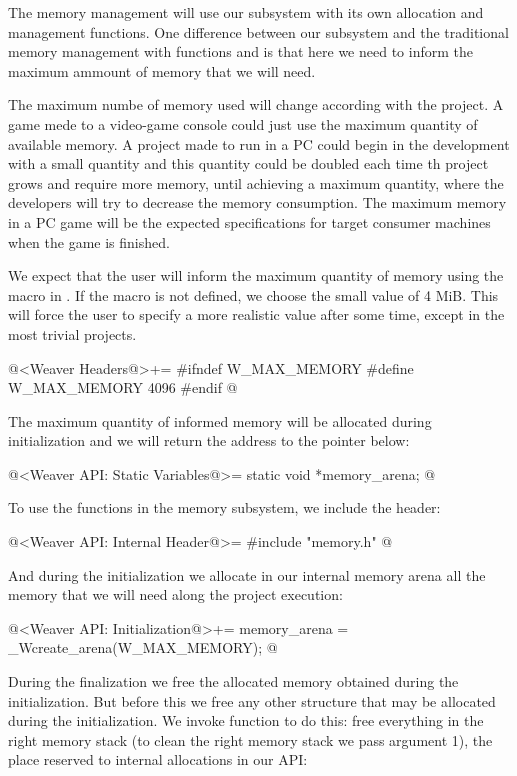 The memory management will use our subsystem with its own allocation
and management functions. One difference between our subsystem and the
traditional memory management with functions 
and  is that here we need to inform the maximum
ammount of memory that we will need.

The maximum numbe of memory used will change according with the
project. A game mede to a video-game console could just use the
maximum quantity of available memory. A project made to run in a PC
could begin in the development with a small quantity and this quantity
could be doubled each time th project grows and require more memory,
until achieving a maximum quantity, where the developers will try to
decrease the memory consumption. The maximum memory in a PC game will
be the expected specifications for target consumer machines when the
game is finished.

We expect that the user will inform the maximum quantity of memory
using the macro 
in . If the macro is not defined, we choose
the small value of 4 MiB. This will force the user to specify a more
realistic value after some time, except in the most trivial projects.

\iniciocodigo
@<Weaver Headers@>+=
#ifndef W_MAX_MEMORY
#define W_MAX_MEMORY 4096
#endif
@
\fimcodigo

The maximum quantity of informed memory will be allocated during
initialization and we will return the address to the pointer below:

\iniciocodigo
@<Weaver API: Static Variables@>=
static void *memory_arena;
@
\fimcodigo

To use the functions in the memory subsystem, we include the header:

\iniciocodigo
@<Weaver API: Internal Header@>=
#include "memory.h"
@
\fimcodigo

And during the initialization we allocate in our internal memory arena
all the memory that we will need along the project execution:

\iniciocodigo
@<Weaver API: Initialization@>+=
memory_arena = _Wcreate_arena(W_MAX_MEMORY);
@
\fimcodigo

During the finalization we free the allocated memory obtained during
the initialization. But before this we free any other structure that
may be allocated during the initialization. We invoke
function  to do this: free everything in the
right memory stack (to clean the right memory stack we pass argument
1), the place reserved to internal allocations in our API:

